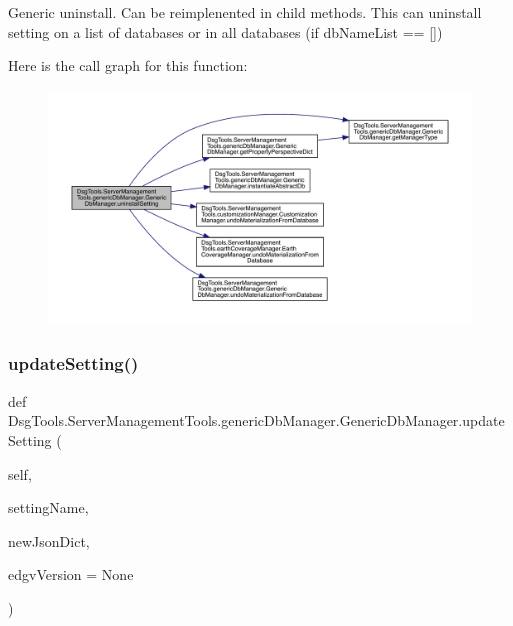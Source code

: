 \begin{DoxyVerb}Generic uninstall. Can be reimplenented in child methods.
This can uninstall setting on a list of databases or in all databases (if dbNameList == [])
\end{DoxyVerb}
 Here is the call graph for this function\+:
\nopagebreak
\begin{figure}[H]
\begin{center}
\leavevmode
\includegraphics[width=350pt]{class_dsg_tools_1_1_server_management_tools_1_1generic_db_manager_1_1_generic_db_manager_a5b45d7939d1ec1d6d4294de4fb84805f_cgraph}
\end{center}
\end{figure}
\mbox{\label{class_dsg_tools_1_1_server_management_tools_1_1generic_db_manager_1_1_generic_db_manager_a4dcc5a53639b84fdc7f847c2a9e65a77}} 
\subsubsection{\texorpdfstring{update\+Setting()}{updateSetting()}}
{\footnotesize\ttfamily def Dsg\+Tools.\+Server\+Management\+Tools.\+generic\+Db\+Manager.\+Generic\+Db\+Manager.\+update\+Setting (\begin{DoxyParamCaption}\item[{}]{self,  }\item[{}]{setting\+Name,  }\item[{}]{new\+Json\+Dict,  }\item[{}]{edgv\+Version = {\ttfamily None} }\end{DoxyParamCaption})}

